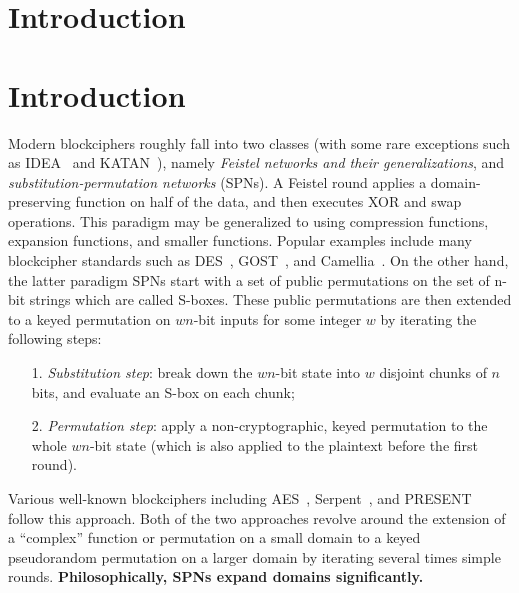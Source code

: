 
\section{Introduction}
\label{section:Introduction}



\section{Introduction}
\label{section:Introduction}

Modern blockciphers roughly fall into two classes (with some rare exceptions such as IDEA~\cite{EC:LaiMas90} and KATAN~\cite{CHES:DeCDunKne09}), namely {\it Feistel networks and their generalizations}, and {\it substitution-permutation networks} (SPNs). A Feistel round applies a domain-preserving function on half of the data, and then executes XOR and swap operations. This paradigm may be generalized to using compression functions, expansion functions, and smaller functions. Popular examples include many blockcipher standards such as DES~\cite{DESDesign}, GOST~\cite{GOSTDesign}, and Camellia~\cite{ISOIEC-18033-3:2010}. On the other hand, the latter paradigm SPNs start with a set of public permutations on the set of n-bit strings which are called S-boxes. These public permutations are then extended to a keyed permutation on $wn$-bit inputs for some integer $w$ by iterating the following steps:
\begin{enumerate}
	\item[1.] {\it Substitution step}: break down the $wn$-bit state into $w$ disjoint chunks of $n$ bits, and evaluate an S-box on each chunk;
	\item[2.] {\it Permutation step}: apply a non-cryptographic, keyed permutation to the whole $wn$-bit state (which is also applied to the plaintext before the first round).
\end{enumerate}
Various well-known blockciphers including AES~\cite{AESDesign}, Serpent~\cite{serpentProposal}, and PRESENT~\cite{CHES:BKLPPR07} follow this approach. Both of the two approaches revolve around the extension of a ``complex'' function or permutation on a small domain to a keyed pseudorandom permutation on a larger domain by iterating several times simple rounds. {\bf Philosophically, SPNs expand domains significantly.}



